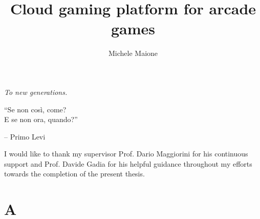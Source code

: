 \documentclass[english]{report}
\title{Cloud gaming platform for arcade games}
\author{Michele Maione}
\begin{document}
\renewcommand\contentsname{Index}
\frontespizio
\beforepreface

{
\raggedleft \large \sl To new generations.\\
	
	\vspace{2cm}
	
	``Se non così, come?\\E se non ora, quando?''
	
	\bigskip
	
	\--- Primo Levi\\
}



I would like to thank my supervisor Prof. Dario Maggiorini for his continuous support and Prof. Davide Gadia for his helpful guidance throughout my efforts towards the completion of the present thesis.

%
%
\afterpreface

















% 
% 

\appendix

\chapter{A}

%
%


\end{document}
